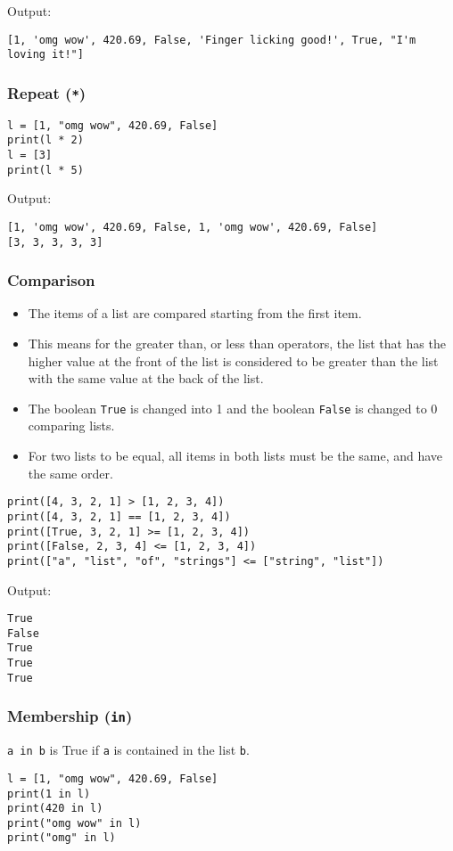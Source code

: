 \documentclass[11pt]{article}
\begin{document}
 \noindent Output:

\label{orgf910d66}
\begin{verbatim}
[1, 'omg wow', 420.69, False, 'Finger licking good!', True, "I'm loving it!"]
\end{verbatim}
\subsubsection{Repeat (\texttt{*})}
\label{sec:orge1149ac}
\begin{verbatim}
l = [1, "omg wow", 420.69, False]
print(l * 2)
l = [3]
print(l * 5)
\end{verbatim}

 \noindent Output:

\label{orge3ec62b}
\begin{verbatim}
[1, 'omg wow', 420.69, False, 1, 'omg wow', 420.69, False]
[3, 3, 3, 3, 3]
\end{verbatim}
\subsubsection{Comparison}
\label{sec:org219674b}
\begin{itemize}
\item The items of a list are compared starting from the first item.
\item This means for the greater than, or less than operators, the list that has the higher value at the front of the list is considered to be greater than the list with the same value at the back of the list.
\item The boolean \texttt{True} is changed into 1 and the boolean \texttt{False} is changed to 0 comparing lists.
\item For two lists to be equal, all items in both lists must be the same, and have the same order.
\end{itemize}
\begin{verbatim}
print([4, 3, 2, 1] > [1, 2, 3, 4])
print([4, 3, 2, 1] == [1, 2, 3, 4])
print([True, 3, 2, 1] >= [1, 2, 3, 4])
print([False, 2, 3, 4] <= [1, 2, 3, 4])
print(["a", "list", "of", "strings"] <= ["string", "list"])
\end{verbatim}

 \noindent Output:

\label{org776080d}
\begin{verbatim}
True
False
True
True
True
\end{verbatim}
\subsubsection{Membership (\texttt{in})}
\label{sec:orgbd3dd88}
\texttt{a in b} is True if \texttt{a} is contained in the list \texttt{b}.
\begin{verbatim}
l = [1, "omg wow", 420.69, False]
print(1 in l)
print(420 in l)
print("omg wow" in l)
print("omg" in l)
\end{verbatim}
\end{document}
